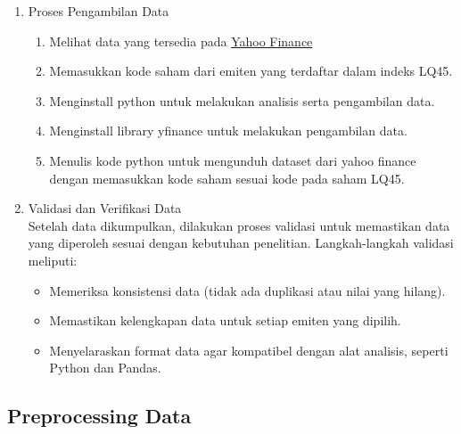\begin{subs}
\begin{enumerate}
		\item Proses Pengambilan Data \\
		      \renewcommand{\labelenumi}{\alph{enumi}.}
		      \begin{enumerate}
			      \item Melihat data yang tersedia pada \href{https://finance.yahoo.com}{Yahoo Finance}
			      \item Memasukkan kode saham dari emiten yang terdaftar dalam indeks LQ45.
			      \item Menginstall python untuk melakukan analisis serta pengambilan data.
			      \item Menginstall library yfinance untuk melakukan pengambilan data.
			      \item Menulis kode python untuk mengunduh dataset dari yahoo finance dengan memasukkan kode saham sesuai kode pada saham LQ45.
		      \end{enumerate}

		\item Validasi dan Verifikasi Data \\
		      Setelah data dikumpulkan, dilakukan proses validasi untuk memastikan data yang diperoleh sesuai dengan kebutuhan penelitian. Langkah-langkah validasi meliputi:
		      \begin{itemize}
			      \item Memeriksa konsistensi data (tidak ada duplikasi atau nilai yang hilang).
			      \item Memastikan kelengkapan data untuk setiap emiten yang dipilih.
			      \item Menyelaraskan format data agar kompatibel dengan alat analisis, seperti Python dan Pandas.
		      \end{itemize}


	\end{enumerate}

	\subsection{Preprocessing Data}
	\renewcommand{\labelenumi}{\alph{enumi}.}
	\indent


\end{subs}
